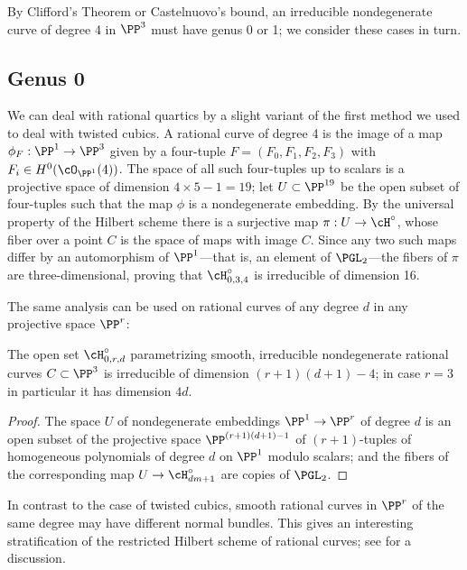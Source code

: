 By Clifford's Theorem or Castelnuovo's bound, an irreducible nondegenerate curve of degree 4 in $\PP^{3}$ must have genus 0 or 1; we consider these cases in turn.

\subsection{Genus 0}\label{degree 4 genus 0}

We can deal with rational quartics by a slight variant of the first method we used to deal with twisted cubics. A rational curve of degree 4 is the image of a map $\phi_F : \PP^1 \to \PP^3$ given by a four-tuple $F = (F_0,F_1,F_2,F_3)$ with $F_i \in H^0(\cO_{\PP^1}(4))$. The space of all such four-tuples up to scalars is a projective space of dimension $4 \times 5 - 1 = 19$; let $U \subset \PP^{19}$ be the open subset of four-tuples such that the map $\phi$ is a nondegenerate embedding. By the universal property of the Hilbert scheme there is a surjective map $\pi : U \to \cH^\circ$, whose fiber over a point $C$ is the space of maps with image $C$. Since any two such maps differ by an automorphism of $\PP^1$---that is, an element of $\PGL_2$---the fibers of $\pi$ are three-dimensional, proving that $\cH^\circ_{0,3,4}$ is irreducible of dimension 16. 

The same analysis can be used on rational curves of any degree $d$ in any projective space $\PP^r$:

\begin{proposition}\label{dimension of rational curves}
The open set $\cH^\circ_{0,r,d}$ parametrizing smooth, irreducible nondegenerate rational curves $C \subset \PP^3$ is irreducible of dimension $(r+1)(d+1)-4$; in case $r=3$ in particular it has dimension $4d$.
\end{proposition}

\begin{proof}
The space $U$ of nondegenerate embeddings $\PP^1 \to \PP^r$ of degree $d$ is an open subset of the projective space $\PP^{(r+1)(d+1)-1}$ of $(r+1)$-tuples of homogeneous polynomials of degree $d$ on $\PP^1$ modulo scalars; and the fibers of the corresponding map $U \to \cH^\circ_{dm+1}$ are copies of $\PGL_2$. 
\end{proof}

In contrast to the case of twisted cubics, smooth rational curves in $\PP^r$ of the same degree may have different normal bundles. This gives an interesting stratification of the restricted Hilbert scheme of rational curves; see \cite{MR3778979} for a discussion.

